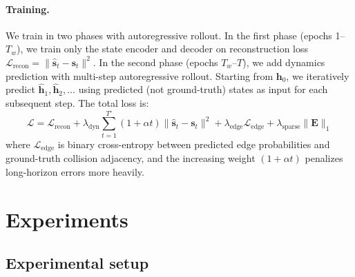 \documentclass{article}
\begin{document}
\paragraph{Training.}
We train in two phases with autoregressive rollout. In the first phase (epochs 1--$T_w$), we train only the state encoder and decoder on reconstruction loss $\mathcal{L}_\text{recon} = \|\hat{\mathbf{s}}_t - \mathbf{s}_t\|^2$. In the second phase (epochs $T_w$--$T$), we add dynamics prediction with multi-step autoregressive rollout. Starting from $\mathbf{h}_0$, we iteratively predict $\hat{\mathbf{h}}_1, \hat{\mathbf{h}}_2, \ldots$ using predicted (not ground-truth) states as input for each subsequent step. The total loss is:
\begin{equation}
    \mathcal{L} = \mathcal{L}_\text{recon} + \lambda_\text{dyn} \sum_{t=1}^{T'} (1 + \alpha t) \|\hat{\mathbf{s}}_t - \mathbf{s}_t\|^2 + \lambda_\text{edge} \mathcal{L}_\text{edge} + \lambda_\text{sparse} \|\mathbf{E}\|_1
\end{equation}
where $\mathcal{L}_\text{edge}$ is binary cross-entropy between predicted edge probabilities and ground-truth collision adjacency, and the increasing weight $(1 + \alpha t)$ penalizes long-horizon errors more heavily.

\section{Experiments}
\label{sec:experiments}

\subsection{Experimental setup}


\end{document}
